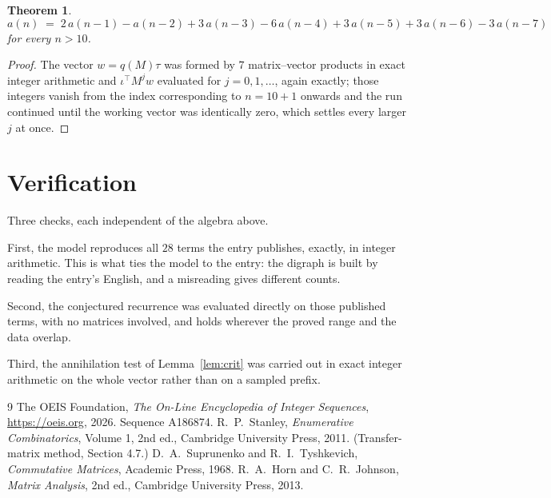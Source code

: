 \documentclass[11pt,a4paper]{article}
\theoremstyle{plain}
\newtheorem{theorem}{Theorem}
\theoremstyle{definition}
\begin{document}
\begin{theorem}
\[
a(n)\;=\;2\,a(n-1) - a(n-2) + 3\,a(n-3) - 6\,a(n-4) + 3\,a(n-5) + 3\,a(n-6) - 3\,a(n-7)
\]
for every $n>10$.
\end{theorem}

\begin{proof}
The vector $w=q(M)\tau$ was formed by $7$ matrix--vector products in exact integer
arithmetic and $\iota^{\!\top}M^{j}w$ evaluated for $j=0,1,\dots$, again exactly; those
integers vanish from the index corresponding to $n=10+1$ onwards and the run continued
until the working vector was identically zero, which settles every larger $j$ at once.
\end{proof}

\section{Verification}

Three checks, each independent of the algebra above.

First, the model reproduces all $28$ terms the entry publishes, exactly, in integer
arithmetic. This is what ties the model to the entry: the digraph is built by reading the
entry's English, and a misreading gives different counts.

Second, the conjectured recurrence was evaluated directly on those published terms, with no
matrices involved, and holds wherever the proved range and the data overlap.

Third, the annihilation test of Lemma~\ref{lem:crit} was carried out in exact integer
arithmetic on the whole vector rather than on a sampled prefix.

\begin{thebibliography}{9}
 The OEIS Foundation, \emph{The On-Line Encyclopedia of Integer
Sequences}, \url{https://oeis.org}, 2026. Sequence A186874.
 R.~P.~Stanley, \emph{Enumerative Combinatorics}, Volume 1, 2nd ed.,
Cambridge University Press, 2011. (Transfer-matrix method, Section 4.7.)
 D.~A.~Suprunenko and R.~I.~Tyshkevich, \emph{Commutative Matrices},
Academic Press, 1968.
 R.~A.~Horn and C.~R.~Johnson, \emph{Matrix Analysis}, 2nd ed., Cambridge
University Press, 2013.
\end{thebibliography}
\end{document}
